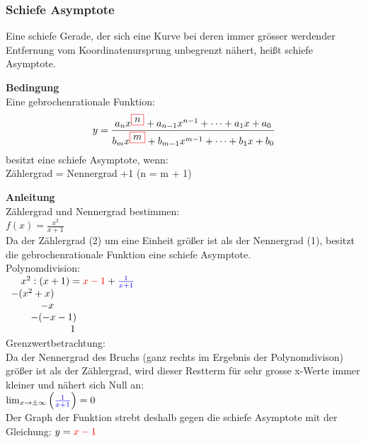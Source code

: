 \begin{multicols}{2}
    \subsubsection{Schiefe Asymptote}
    \vspace{-4mm}
    Eine schiefe Gerade, der sich eine Kurve bei deren immer grösser werdender Entfernung vom Koordinatenursprung unbegrenzt nähert, heißt schiefe Asymptote.

    \textbf{Bedingung}\\
    Eine gebrochenrationale Funktion:
    \[y = \frac{a_n x^{\fcolorbox{red}{white}{$n$}} + a_{n-1} x^{n-1} + \dots + a_1 x + a_ 0}{b_m x^{\fcolorbox{red}{white}{$m$}} + b_{m-1} x^{m-1} + \dots + b_1 x + b_ 0}\]
    besitzt eine schiefe Asymptote, wenn: \\
    Zählergrad = Nennergrad +1 (n = m + 1)

    \textbf{Anleitung} \\
    Zählergrad und Nennergrad bestimmen: \\
    $f(x) = \frac{x^2}{x+1}$ \\
    Da der Zählergrad (2) um eine Einheit größer ist als der Nennergrad (1), besitzt die gebrochenrationale Funktion eine schiefe Asymptote. \\
    Polynomdivision: \\
    $\begin{array}{l} \quad x^2:(x+1)= {\color{red}x - 1}+ {\color{blue}\frac{1}{x+1}} \\ -(x^2 + x) \\ \qquad \quad -x \\ \qquad -(-x-1) \\ \qquad \qquad \qquad 1 \end{array}$ \\
    Grenzwertbetrachtung: \\
    Da der Nennergrad des Bruchs (ganz rechts im Ergebnis der Polynomdivison) größer ist als der Zählergrad, wird dieser Restterm für sehr grosse x-Werte immer kleiner und nähert sich Null an: \\
    $\lim_{x\to \pm\infty}\left({\color{blue}\frac{1}{x+1}}\right) = 0$ \\
    Der Graph der Funktion strebt deshalb gegen die schiefe Asymptote mit der Gleichung: $y = {\color{red}x-1}$



\end{multicols}
